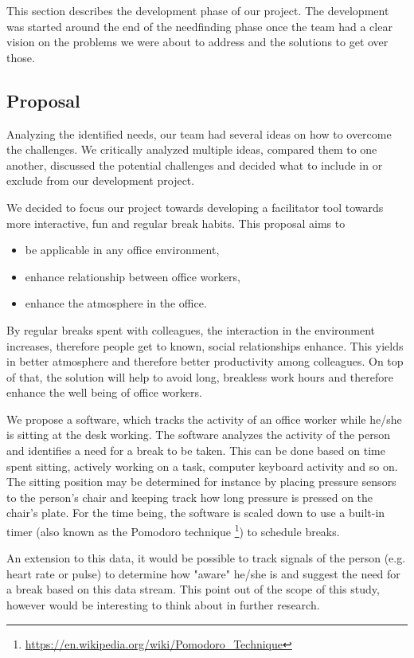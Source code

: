 This section describes the development phase of our project. The development was started around the end of the 
needfinding phase once the team had a clear vision on the problems we were about to address and the solutions to get 
over those.

\subsection{Proposal}
Analyzing the identified needs, our team had several ideas on how to overcome the challenges. We critically analyzed 
multiple ideas, compared them to one another, discussed the potential challenges and decided what to include in or 
exclude from our development project. 

We decided to focus our project towards developing a facilitator tool towards more interactive, fun and regular break 
habits. This proposal aims to 
\begin{itemize}
	\item be applicable in any office environment,
	\item enhance relationship between office workers,
 	\item enhance the atmosphere in the office.
\end{itemize}

By regular breaks spent with colleagues, the interaction in the environment increases, therefore people get to known, 
social relationships enhance. This yields in better atmosphere and therefore better productivity among colleagues. On 
top of that, the solution will help to avoid long, breakless work hours and therefore enhance the well being of office 
workers. 

We propose a software, which tracks the activity of an office worker while he/she is sitting at the desk working. The 
software analyzes the activity of the person and identifies a need for a break to be taken. This can be done based on 
time spent sitting, actively working on a task, computer keyboard activity and so on. The sitting position may be 
determined for instance by placing pressure sensors to the person's chair and keeping track how long pressure is 
pressed on the chair's plate. For the time being, the software is scaled down to use a built-in timer (also known as 
the Pomodoro technique \footnote{\url{https://en.wikipedia.org/wiki/Pomodoro_Technique}}) to schedule breaks. 

An extension to this data, it would be possible to track signals of the person (e.g. heart rate or pulse) to determine 
how "aware" he/she is and suggest the need for a break based on this data stream. This point out of the scope of this 
study, however would be interesting to think about in further research. 

